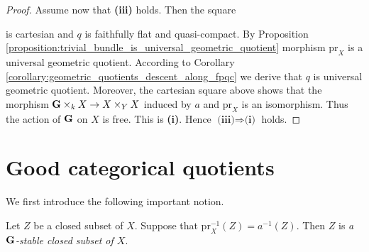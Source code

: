 \begin{proof}
Assume now that \textbf{(iii)} holds. Then the square
\begin{center}
\end{center}
is cartesian and $q$ is faithfully flat and quasi-compact. By Proposition \ref{proposition:trivial_bundle_is_universal_geometric_quotient} morphism $\mathrm{pr}_X$ is a universal geometric quotient. According to Corollary \ref{corollary:geometric_quotients_descent_along_fpqc} we derive that $q$ is universal geometric quotient. Moreover, the cartesian square above shows that the morphism $\mathbf{G}\times_kX\rightarrow X\times_YX$ induced by $a$ and $\mathrm{pr}_X$ is an isomorphism. Thus the action of $\mathbf{G}$ on $X$ is free. This is \textbf{(i)}. Hence $\textbf{(iii)}\Rightarrow \textbf{(i)}$ holds.
\end{proof}

\section{Good categorical quotients}
\noindent
We first introduce the following important notion.

\begin{definition}
Let $Z$ be a closed subset of $X$. Suppose that $\mathrm{pr}_X^{-1}(Z) = a^{-1}(Z)$. Then $Z$ is \textit{a $\mathbf{G}$-stable closed subset of $X$}. 
\end{definition}

